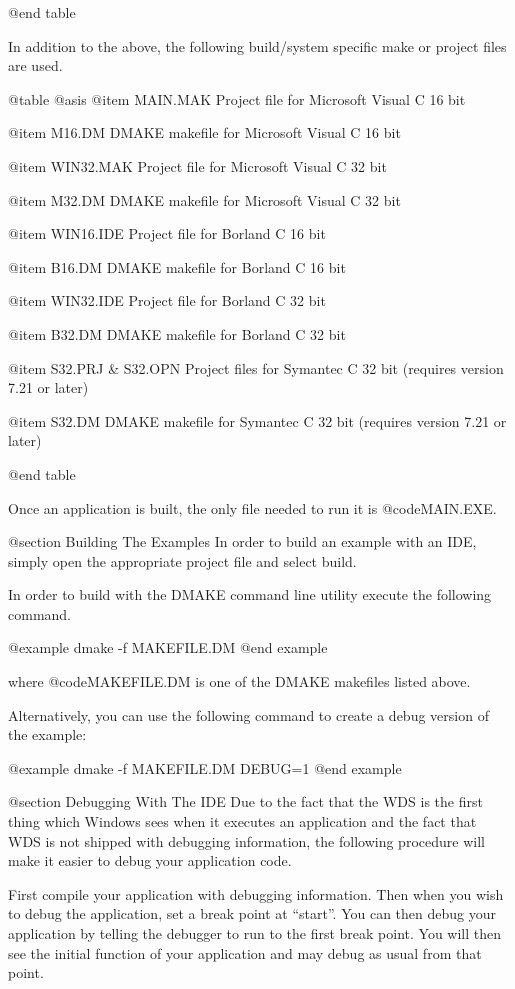 @end table


In addition to the above, the following build/system specific make or
project files are used.

@table @asis
@item MAIN.MAK
Project file for Microsoft Visual C 16 bit

@item M16.DM
DMAKE makefile for Microsoft Visual C 16 bit

@item WIN32.MAK
Project file for Microsoft Visual C 32 bit

@item M32.DM
DMAKE makefile for Microsoft Visual C 32 bit

@item WIN16.IDE
Project file for Borland C 16 bit

@item B16.DM
DMAKE makefile for Borland C 16 bit

@item WIN32.IDE
Project file for Borland C 32 bit

@item B32.DM
DMAKE makefile for Borland C 32 bit

@item S32.PRJ & S32.OPN
Project files for Symantec C 32 bit
(requires version 7.21 or later)

@item S32.DM
DMAKE makefile for Symantec C 32 bit
(requires version 7.21 or later)

@end table


Once an application is built, the only file needed to run it is
@code{MAIN.EXE}.



@section Building The Examples
In order to build an example with an IDE, simply open the appropriate
project file and select build.

In order to build with the DMAKE command line utility execute the
following command.

@example
dmake -f MAKEFILE.DM
@end example

where @code{MAKEFILE.DM} is one of the DMAKE makefiles listed above.

Alternatively, you can use the following command to create a debug
version of the example:

@example
dmake -f MAKEFILE.DM  DEBUG=1
@end example



@section Debugging With The IDE
Due to the fact that the WDS is the first thing which Windows sees
when it executes an application and the fact that WDS is not shipped
with debugging information, the following procedure will make it
easier to debug your application code.

First compile your application with debugging information.  Then when you
wish to debug the application, set a break point at ``start''.  You
can then debug your application by telling the debugger to run to the first
break point.  You will then see the initial function of your application
and may debug as usual from that point.


